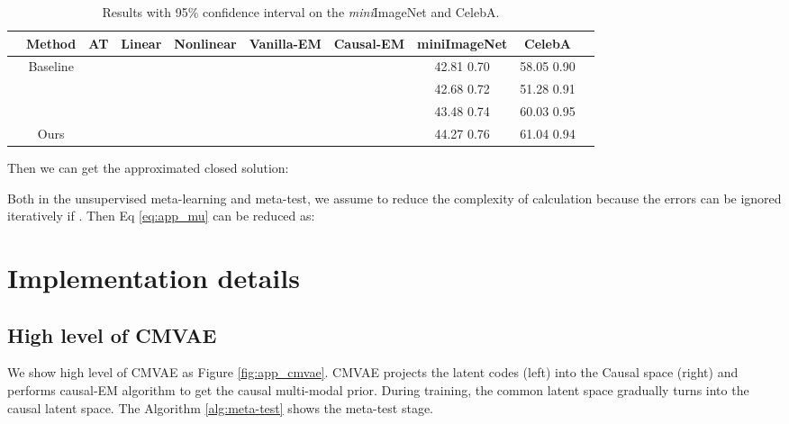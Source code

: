 \documentclass[letterpaper]{article} \usepackage{aaai23}  \usepackage{times}  \usepackage{helvet}  \usepackage{courier}  \usepackage[hyphens]{url}  \usepackage{graphicx} \urlstyle{rm} \def\UrlFont{\rm}  \usepackage{natbib}  \usepackage{caption} \frenchspacing  \setlength{\pdfpagewidth}{8.5in}  \setlength{\pdfpageheight}{11in}  \usepackage{algorithm}
\theoremstyle{plain}
\theoremstyle{definition}
\theoremstyle{remark}
\begin{document}
\begin{table*}[]
	\centering
	\caption{Results with 95\% confidence interval on the \textit{mini}ImageNet and CelebA.}  
	\label{tab:app_res_each}
	\begin{tabular}{lccccccccc}
		\toprule
		& Method     & AT         & Linear     & Nonlinear  & Vanilla-EM & Causal-EM  & miniImageNet     & CelebA           &  \\ \midrule
		& Baseline   &            &            &            &           &            & 42.81  0.70 & 58.05  0.90 &  \\
		&            &           &           &            &           &            & 42.68  0.72 & 51.28  0.91 &  \\
		&            &           &            &           &           &            & 43.48  0.74 & 60.03  0.95 &  \\
		& Ours       &           &            &           &            &           & 44.27  0.76 & 61.04  0.94 & \\ \bottomrule
	\end{tabular}
	
\end{table*}

Then we can get the approximated closed solution:
\begin{small}
	
\end{small}	
Both in the unsupervised meta-learning and meta-test, we assume   to reduce the complexity of calculation because the errors can be ignored iteratively if . Then Eq \ref{eq:app_mu} can be reduced as:





\section{Implementation details} \label{app:implementation}
\subsection{High level of CMVAE}
We show high level of CMVAE as Figure \ref{fig:app_cmvae}. CMVAE projects the latent codes (left) into the Causal space (right) and performs causal-EM algorithm to get the causal multi-modal prior. During training, the common latent space gradually turns into the causal latent space.  The Algorithm \ref{alg:meta-test} shows the meta-test stage.
\end{document}

